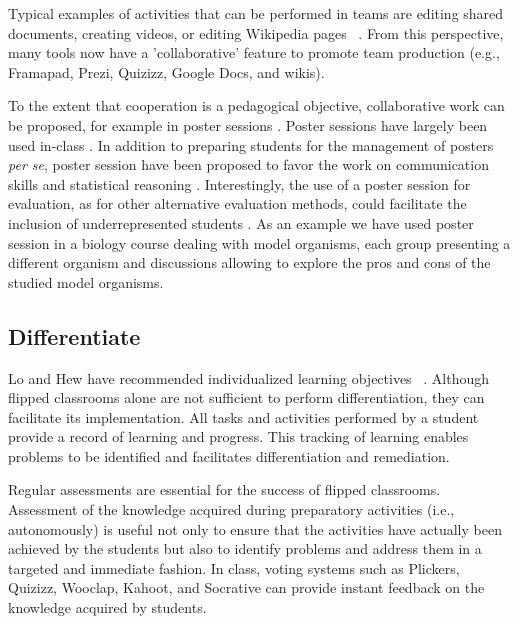 \documentclass[10pt,letterpaper]{article}
\begin{document}
Typical examples of activities that can be performed in teams are editing shared documents, creating videos, or editing Wikipedia pages ~\cite{logan_ten_2010}. From this perspective, many tools now have a 'collaborative' feature to promote team production (e.g., Framapad, Prezi, Quizizz, Google Docs, and wikis). 

To the extent that cooperation is a pedagogical objective, collaborative work can be proposed, for example in poster sessions \cite{gerczei2016impact,marino2000using}. Poster sessions have largely been used in-class \cite{kennedy1985poster,wimpfheimer2004peer,baird1991class,sisak1997poster,widanski2016providing}. In addition to preparing students for the management of posters \textit{per se}, poster session have been proposed to favor the work on communication skills and statistical reasoning \cite{logan2015poster}. Interestingly, the use of a poster session for evaluation, as for other alternative evaluation methods, could facilitate the inclusion of underrepresented students \cite{gerczei2016impact,marino2000using}.
As an example we have used poster session in a biology course dealing with model organisms, each group presenting a different organism and discussions allowing to explore the pros and cons of the studied model organisms. 

\subsection{Differentiate}

Lo and Hew have recommended individualized learning objectives ~\cite{lo_critical_2017}. Although flipped classrooms alone are not sufficient to perform differentiation, they can facilitate its implementation. All tasks and activities performed by a student provide a record of learning and progress. This tracking of learning enables problems to be identified and facilitates differentiation and remediation.

Regular assessments are essential for the success of flipped classrooms. Assessment of the knowledge acquired during preparatory activities (i.e., autonomously) is useful not only to ensure that the activities have actually been achieved by the students but also to identify problems and address them in a targeted and immediate fashion. 
In class, voting systems such as Plickers, Quizizz, Wooclap, Kahoot, and Socrative can provide instant feedback on the knowledge acquired by students.
\end{document}

